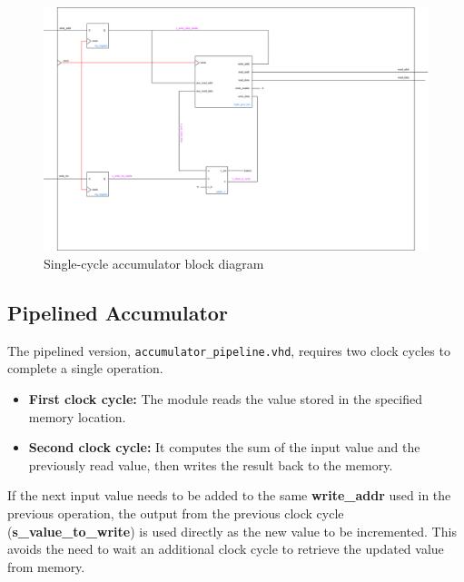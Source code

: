 \documentclass[a4paper,12pt]{article}
\begin{document}
\begin{figure}[H]
    \centering
    \includegraphics[width=1.0\linewidth]{accumulator_single_cycle.png}
    \caption{Single-cycle accumulator block diagram}
    \label{fig:single_cycle}
\end{figure}


\subsection{Pipelined Accumulator}
The pipelined version, \texttt{accumulator\_pipeline.vhd}, requires two clock cycles to complete a single operation.
\begin{itemize}
    \item \textbf{First clock cycle:} The module reads the value stored in the specified memory location.
    \item \textbf{Second clock cycle:} It computes the sum of the input value and the previously read value, then writes the result back to the memory.
\end{itemize}
    

If the next input value needs to be added to the same \textbf{write\_addr} used in the previous operation, the output from the previous clock cycle (\textbf{s\_value\_to\_write}) is used directly as the new value to be incremented. This avoids the need to wait an additional clock cycle to retrieve the updated value from memory.
\end{document}
